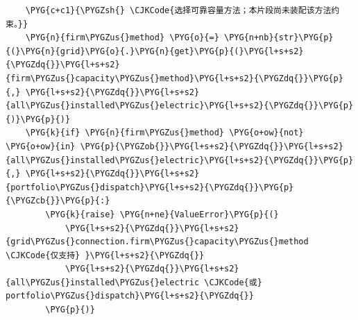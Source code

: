 \begin{Verbatim}
    \PYG{c+c1}{\PYGZsh{} \CJKCode{选择可靠容量方法；本片段尚未装配该方法约束。}}
    \PYG{n}{firm\PYGZus{}method} \PYG{o}{=} \PYG{n+nb}{str}\PYG{p}{(}\PYG{n}{grid}\PYG{o}{.}\PYG{n}{get}\PYG{p}{(}\PYG{l+s+s2}{\PYGZdq{}}\PYG{l+s+s2}{firm\PYGZus{}capacity\PYGZus{}method}\PYG{l+s+s2}{\PYGZdq{}}\PYG{p}{,} \PYG{l+s+s2}{\PYGZdq{}}\PYG{l+s+s2}{all\PYGZus{}installed\PYGZus{}electric}\PYG{l+s+s2}{\PYGZdq{}}\PYG{p}{)}\PYG{p}{)}
    \PYG{k}{if} \PYG{n}{firm\PYGZus{}method} \PYG{o+ow}{not} \PYG{o+ow}{in} \PYG{p}{\PYGZob{}}\PYG{l+s+s2}{\PYGZdq{}}\PYG{l+s+s2}{all\PYGZus{}installed\PYGZus{}electric}\PYG{l+s+s2}{\PYGZdq{}}\PYG{p}{,} \PYG{l+s+s2}{\PYGZdq{}}\PYG{l+s+s2}{portfolio\PYGZus{}dispatch}\PYG{l+s+s2}{\PYGZdq{}}\PYG{p}{\PYGZcb{}}\PYG{p}{:}
        \PYG{k}{raise} \PYG{n+ne}{ValueError}\PYG{p}{(}
            \PYG{l+s+s2}{\PYGZdq{}}\PYG{l+s+s2}{grid\PYGZus{}connection.firm\PYGZus{}capacity\PYGZus{}method \CJKCode{仅支持} }\PYG{l+s+s2}{\PYGZdq{}}
            \PYG{l+s+s2}{\PYGZdq{}}\PYG{l+s+s2}{all\PYGZus{}installed\PYGZus{}electric \CJKCode{或} portfolio\PYGZus{}dispatch}\PYG{l+s+s2}{\PYGZdq{}}
        \PYG{p}{)}
\end{Verbatim}
